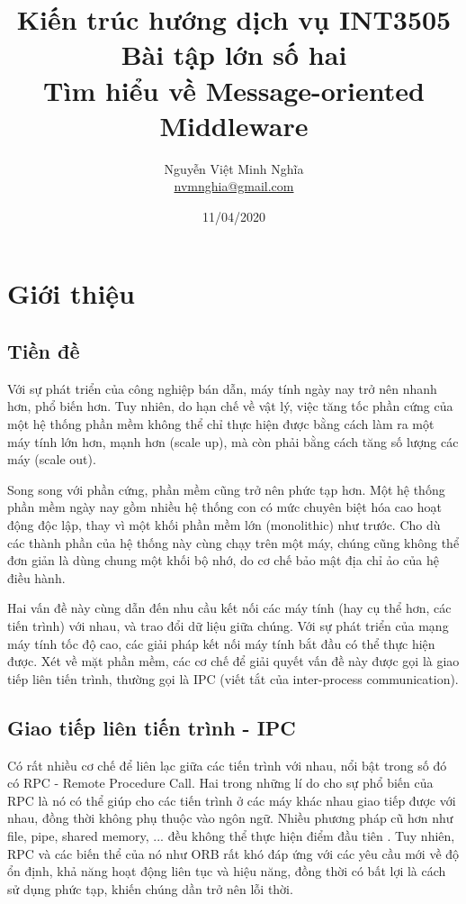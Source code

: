 \documentclass{article}
\author{Nguyễn Việt Minh Nghĩa \\ \href{mailto:nvmnghia@gmail.com}{nvmnghia@gmail.com}}
\date{11/04/2020}
\title{Kiến trúc hướng dịch vụ INT3505 \\ Bài tập lớn số hai \\ Tìm hiểu về Message-oriented Middleware}
\begin{document}
\maketitle

\section{Giới thiệu}

\subsection{Tiền đề}

Với sự phát triển của công nghiệp bán dẫn, máy tính ngày nay trở nên nhanh hơn,
phổ biến hơn. Tuy nhiên, do hạn chế về vật lý, việc tăng tốc phần cứng của một
hệ thống phần mềm không thể chỉ thực hiện được bằng cách làm ra một máy tính lớn
hơn, mạnh hơn (scale up), mà còn phải bằng cách tăng số lượng các máy (scale
out).

Song song với phần cứng, phần mềm cũng trở nên phức tạp hơn. Một hệ thống phần
mềm ngày nay gồm nhiều hệ thống con có mức chuyên biệt hóa cao hoạt động độc
lập, thay vì một khối phần mềm lớn (monolithic) như trước. Cho dù các thành phần
của hệ thống này cùng chạy trên một máy, chúng cũng không thể đơn giản là dùng
chung một khối bộ nhớ, do cơ chế bảo mật địa chỉ ảo của hệ điều hành.

Hai vấn đề này cùng dẫn đến nhu cầu kết nối các máy tính (hay cụ thể hơn, các
tiến trình) với nhau, và trao đổi dữ liệu giữa chúng. Với sự phát triển của mạng
máy tính tốc độ cao, các giải pháp kết nối máy tính bắt đầu có thể thực hiện
được. Xét về mặt phần mềm, các cơ chế để giải quyết vấn đề này được gọi là giao
tiếp liên tiến trình, thường gọi là IPC (viết tắt của inter-process
communication).

\subsection{Giao tiếp liên tiến trình - IPC}

Có rất nhiều cơ chế để liên lạc giữa các tiến trình với nhau, nổi bật trong số
đó có RPC - Remote Procedure Call. Hai trong những lí do cho sự phổ biến của RPC
là nó có thể giúp cho các tiến trình ở các máy khác nhau giao tiếp được với
nhau, đồng thời không phụ thuộc vào ngôn ngữ. Nhiều phương pháp cũ hơn như file,
pipe, shared memory, ... đều không thể thực hiện điểm đầu tiên \cite{osc12}. Tuy
nhiên, RPC và các biến thể của nó như ORB rất khó đáp ứng với các yêu cầu mới về
độ ổn định, khả năng hoạt động liên tục và hiệu năng, đồng thời có bất lợi là
cách sử dụng phức tạp, khiến chúng dần trở nên lỗi thời.
\end{document}

